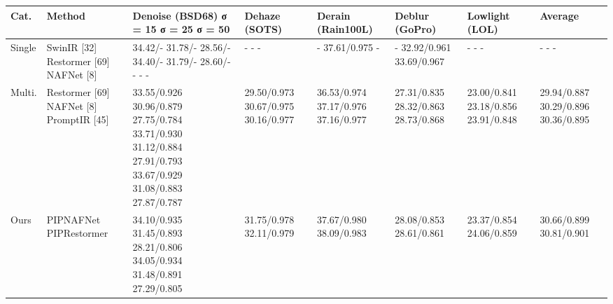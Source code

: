 \begin{tabular}{llllllll}
\toprule
Cat. & Method & Denoise (BSD68) σ = 15 σ = 25 σ = 50 & Dehaze (SOTS) & Derain (Rain100L) & Deblur (GoPro) & Lowlight (LOL) & Average \\
\midrule
Single & SwinIR [32] Restormer [69] NAFNet [8] & 34.42/- 31.78/- 28.56/- 34.40/- 31.79/- 28.60/- - - - & - - - & - 37.61/0.975 - & - 32.92/0.961 33.69/0.967 & - - - & - - - \\
Multi. & Restormer [69] NAFNet [8] PromptIR [45] & 33.55/0.926 30.96/0.879 27.75/0.784 33.71/0.930 31.12/0.884 27.91/0.793 33.67/0.929 31.08/0.883 27.87/0.787 & 29.50/0.973 30.67/0.975 30.16/0.977 & 36.53/0.974 37.17/0.976 37.16/0.977 & 27.31/0.835 28.32/0.863 28.73/0.868 & 23.00/0.841 23.18/0.856 23.91/0.848 & 29.94/0.887 30.29/0.896 30.36/0.895 \\
Ours & PIPNAFNet PIPRestormer & 34.10/0.935 31.45/0.893 28.21/0.806 34.05/0.934 31.48/0.891 27.29/0.805 & 31.75/0.978 32.11/0.979 & 37.67/0.980 38.09/0.983 & 28.08/0.853 28.61/0.861 & 23.37/0.854 24.06/0.859 & 30.66/0.899 30.81/0.901 \\
\bottomrule
\end{tabular}
